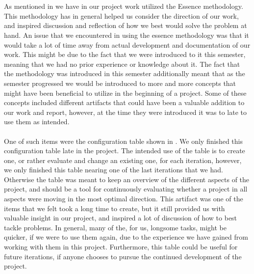 \\\\
As mentioned in  we have in our project work utilized the Essence methodology. This methodology has in general helped us consider the direction of our work, and inspired discussion and reflection of how we best would solve the problem at hand. An issue that we encountered in using the essence methodology was that it would take a lot of time away from actual development and documentation of our work. This might be due to the fact that we were introduced to it this semester, meaning that we had no prior experience or knowledge about it. The fact that the methodology was introduced in this semester additionally meant that as the semester progressed we would be introduced to more and more concepts that might have been beneficial to utilize in the beginning of a project. Some of these concepts included different artifacts that could have been a valuable addition to our work and report, however, at the time they were introduced it was to late to use them as intended.
\\\\
One of such items were the configuration table shown in . We only finished this configuration table late in the project. The intended use of the table is to create one, or rather evaluate and change an existing one, for each iteration, however, we only finished this table nearing one of the last iterations that we had. Otherwise the table was meant to keep an overview of the different aspects of the project, and should be a tool for continuously evaluating whether a project in all aspects were moving in the most optimal direction. This artifact was one of the items that we felt took a long time to create, but it still provided us with valuable insight in our project, and inspired a lot of discussion of how to best tackle problems. In general, many of the, for us, longsome tasks, might be quicker, if we were to use them again, due to the experience we have gained from working with them in this project. Furthermore, this table could be useful for future iterations, if anyone chooses to pursue the continued development of the project.


